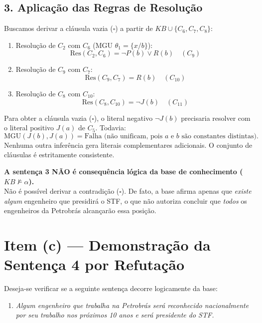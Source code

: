 \documentclass[11pt,a4paper]{article}
\begin{document}
\subsection*{3. Aplicação das Regras de Resolução}
Buscamos derivar a cláusula vazia ($\square$) a partir de $KB \cup \{C_6, C_7, C_8\}$:
\begin{enumerate}[label=\arabic*.]
    \item Resolução de $C_2$ com $C_6$ (MGU $\theta_1 = \{x / b\}$):
    \[
    \mathrm{Res}(C_2, C_6) = \neg P(b) \lor R(b) \quad (C_9)
    \]
    \item Resolução de $C_9$ com $C_7$:
    \[
    \mathrm{Res}(C_9, C_7) = R(b) \quad (C_{10})
    \]
    \item Resolução de $C_8$ com $C_{10}$:
    \[
    \mathrm{Res}(C_8, C_{10}) = \neg J(b) \quad (C_{11})
    \]
\end{enumerate}

Para obter a cláusula vazia ($\square$), o literal negativo $\neg J(b)$ precisaria resolver com o literal positivo $J(a)$ de $C_5$. Todavia:
\[
\mathrm{MGU}(J(b), J(a)) = \text{Falha (não unificam, pois $a$ e $b$ são constantes distintas)}.
\]
Nenhuma outra inferência gera literais complementares adicionais. O conjunto de cláusulas é estritamente consistente.

\begin{tcolorbox}[colback=red!5!white,colframe=red!70!black,title=\textbf{Conclusão do Item (b)}]
\textbf{A sentença 3 NÃO é consequência lógica da base de conhecimento ($KB \not\models \alpha$).} \\
Não é possível derivar a contradição ($\square$). De fato, a base afirma apenas que \emph{existe algum} engenheiro que presidirá o STF, o que não autoriza concluir que \emph{todos} os engenheiros da Petrobrás alcançarão essa posição.
\end{tcolorbox}

\section*{Item (c) --- Demonstração da Sentença 4 por Refutação}

Deseja-se verificar se a seguinte sentença decorre logicamente da base:
\begin{enumerate}
    \item[\textbf{4.}] \textit{Algum engenheiro que trabalha na Petrobrás será reconhecido nacionalmente por seu trabalho nos próximos 10 anos e será presidente do STF.}
\end{enumerate}
\end{document}
